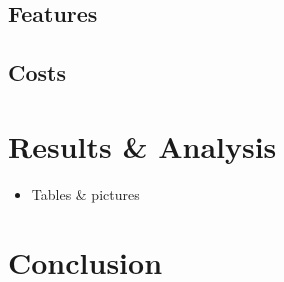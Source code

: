 \documentclass[11pt,a4paper,twoside,openright]{report}
\begin{document}

\section{Features}


\section{Costs}


\chapter{Results \& Analysis}


\begin{itemize}
  \item Tables \& pictures
\end{itemize}

\chapter{Conclusion}

{}

\end{document}
